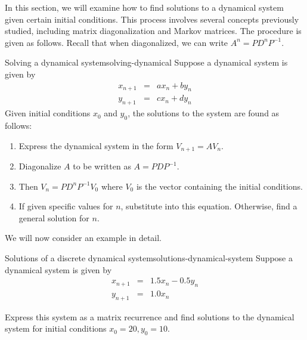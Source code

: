 In this section, we will examine how to find solutions to a dynamical
system given certain initial conditions. This process involves several
concepts previously studied, including matrix diagonalization and
Markov matrices. The procedure is given as follows. Recall that when
diagonalized, we can write $A^{n} = PD^{n}P^{-1}$.

\begin{procedure}{Solving a dynamical system}{solving-dynamical}
  Suppose a dynamical system is given by
  \begin{eqnarray*}
    x_{n+1} &=& a x_n + b y_n \\
    y_{n+1} &=& c x_n + d y_n
  \end{eqnarray*}
  Given initial conditions $x_0$ and $y_0$, the solutions to the
  system are found as follows:
  \begin{enumerate}
  \item Express the dynamical system in the form $V_{n+1} = AV_n$.
  \item Diagonalize $A$ to be written as $A = PDP^{-1}$.
  \item Then $V_{n} = PD^{n} P^{-1} V_{0}$ where $V_{0}$ is the vector
    containing the initial conditions.
  \item If given specific values for $n$, substitute into this
    equation. Otherwise, find a general solution for $n$.
  \end{enumerate}
\end{procedure}

We will now consider an example in detail.

\begin{example}{Solutions of a discrete dynamical system}{solutions-dynamical-system}
  Suppose a dynamical system is given by
  \begin{eqnarray*}
    x_{n+1} &=& 1.5 x_n - 0.5y_n\\
    y_{n+1} &=& 1.0 x_n
  \end{eqnarray*}

  Express this system as a matrix recurrence and find solutions to the
  dynamical system for initial conditions $x_0=20, y_0=10$.
\end{example}

